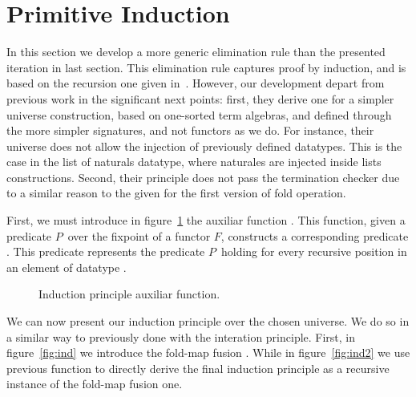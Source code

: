 \documentclass{book}
\begin{document}
\section{Primitive Induction}\label{sec:pimind}

In this section we develop a more generic elimination rule than the presented iteration in last section. This elimination rule captures proof by induction, and is based on the recursion one given in~\cite{Benke:2003}. However, our development depart from previous work in the significant next points: first, they derive one for a simpler universe construction, based on one-sorted term algebras, and defined through the more simpler signatures, and not functors as we do. For instance, their universe does not allow the injection of previously defined datatypes. This is the case in the list of naturals datatype, where naturales are injected inside lists constructions. Second, their principle does not pass the termination checker due to a similar reason to the given for the first version of fold operation.



First, we must introduce in figure~\ref{fig:fih} the auxiliar function . This function, given a predicate $P$\ over the fixpoint of a functor $F$, constructs a corresponding predicate . This predicate represents the predicate $P$\ holding for every recursive  position  in an element of datatype .

\begin{figure}[h!]
  \caption{Induction principle auxiliar function.}
\label{fig:fih}
\end{figure}

We can now present our induction principle over the chosen universe. We do so in a similar way to previously done with the interation principle. First, in figure~\ref{fig:ind} we introduce the fold-map fusion . While in figure~\ref{fig:ind2} we use previous function to directly derive the final induction principle as a recursive instance of the fold-map fusion one. 
\end{document}
